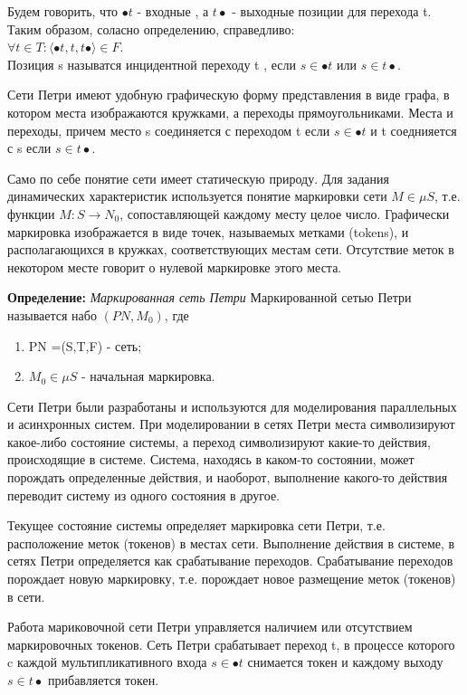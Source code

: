 \documentclass[a4paper,14pt]{article}
\begin{document}
Будем говорить, что $\bullet t$ - входные , а $t \bullet$ - выходные позиции для перехода t. Таким образом, соласно определению, справедливо:\\ $\forall t \in T : \langle \bullet t, t, t \bullet \rangle \in F $.\\ Позиция s называтся инцидентной переходу t , если $s \in \bullet t$ или $s \in t \bullet$.


Сети Петри имеют удобную графическую форму представления в виде графа, в котором места изображаются кружками, а переходы прямоугольниками. Места и переходы, причем место s соединяется с переходом t если $s \in \bullet t$ и t соеднияется с s если $s \in t \bullet$. 

Само по себе понятие сети имеет статическую природу. Для задания динамических характеристик используется понятие маркировки сети $M \in \mu S$, т.е. функции $M : S \longrightarrow N_{0}$, сопоставляющей каждому месту целое число. Графически маркировка изображается в виде точек, называемых метками (tokens), и располагающихся в кружках, соответствующих местам сети. Отсутствие меток в некотором месте говорит о нулевой маркировке этого места.

\textbf{Определение:}  \textit{Маркированная сеть Петри}
Маркированной сетью Петри называется набо $(PN, M_{0})$, где
\begin{enumerate}
\item PN =(S,T,F) - сеть;
\item $M_{0} \in  \mu S$ - начальная маркировка.
\end{enumerate}

Сети Петри были разработаны и используются для моделирования параллельных и асинхронных систем. При моделировании в сетях Петри места символизируют какое-либо состояние системы, а переход символизируют какие-то действия, происходящие в системе. Система, находясь в каком-то состоянии, может порождать определенные действия, и наоборот, выполнение какого-то действия переводит систему из одного состояния в другое.

Текущее состояние системы определяет маркировка сети Петри, т.е. расположение меток (токенов) в местах сети. Выполнение действия в системе, в сетях Петри определяется как срабатывание переходов. Срабатывание переходов порождает новую маркировку, т.е. порождает новое размещение меток (токенов) в сети. 

Работа мариковочной сети Петри управляется наличием или отсутствием маркировочных токенов. Сеть Петри срабатывает  переход t, в процессе которого c каждой  мультипликативного входа $s \in \bullet t$ снимается  токен и каждому выходу $s \in t \bullet$ прибавляется токен.
\end{document}
